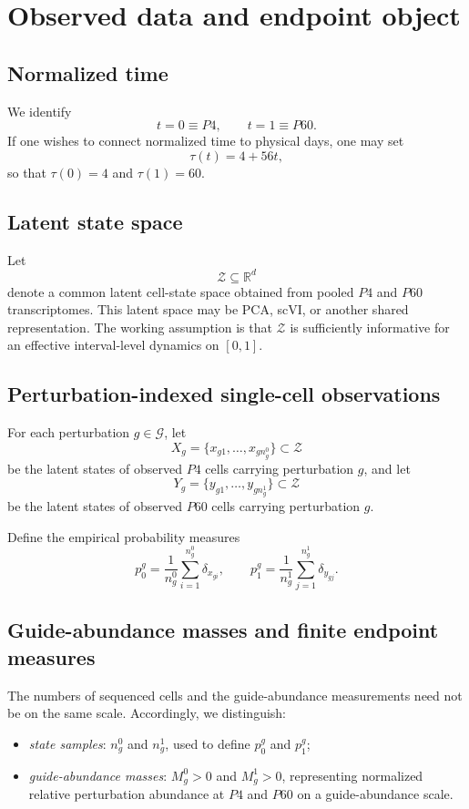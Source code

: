 \documentclass[11pt]{article}
\newcommand{\R}{\mathbb{R}}
\newcommand{\Gcal}{\mathcal{G}}
\newcommand{\Zcal}{\mathcal{Z}}
\begin{document}
\section{Observed data and endpoint object}

\subsection{Normalized time}

We identify
\[
t=0 \equiv P4,
\qquad
t=1 \equiv P60.
\]
If one wishes to connect normalized time to physical days, one may set
\[
\tau(t)=4+56t,
\]
so that $\tau(0)=4$ and $\tau(1)=60$.

\subsection{Latent state space}

Let
\[
\Zcal \subseteq \R^d
\]
denote a common latent cell-state space obtained from pooled $P4$ and $P60$ transcriptomes. This latent space may be PCA, scVI, or another shared representation. The working assumption is that $\Zcal$ is sufficiently informative for an effective interval-level dynamics on $[0,1]$.

\subsection{Perturbation-indexed single-cell observations}

For each perturbation $g\in\Gcal$, let
\[
X_g = \{x_{g1},\dots,x_{g n_g^0}\}\subset \Zcal
\]
be the latent states of observed $P4$ cells carrying perturbation $g$, and let
\[
Y_g = \{y_{g1},\dots,y_{g n_g^1}\}\subset \Zcal
\]
be the latent states of observed $P60$ cells carrying perturbation $g$.

Define the empirical probability measures
\begin{equation}
p_0^g
=
\frac{1}{n_g^0}\sum_{i=1}^{n_g^0}\delta_{x_{gi}},
\qquad
p_1^g
=
\frac{1}{n_g^1}\sum_{j=1}^{n_g^1}\delta_{y_{gj}}.
\label{eq:empirical_prob_measures}
\end{equation}

\subsection{Guide-abundance masses and finite endpoint measures}

The numbers of sequenced cells and the guide-abundance measurements need not be on the same scale. Accordingly, we distinguish:
\begin{itemize}[leftmargin=2em]
    \item \emph{state samples}: $n_g^0$ and $n_g^1$, used to define $p_0^g$ and $p_1^g$;
    \item \emph{guide-abundance masses}: $M_g^0>0$ and $M_g^1>0$, representing normalized relative perturbation abundance at $P4$ and $P60$ on a guide-abundance scale.
\end{itemize}
\end{document}
